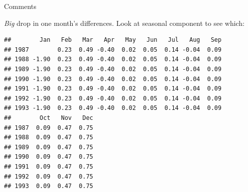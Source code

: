 \begin{frame}[fragile]{Comments}
  
\emph{Big} drop in one month's differences. Look at seasonal component to
see which:  
  


{\small
\begin{knitrout}
\color{fgcolor}\begin{kframe}
\begin{alltt}
\hlopt{$}\hlstd{)}
\end{alltt}
\begin{verbatim}
##        Jan   Feb   Mar   Apr   May   Jun   Jul   Aug   Sep
## 1987        0.23  0.49 -0.40  0.02  0.05  0.14 -0.04  0.09
## 1988 -1.90  0.23  0.49 -0.40  0.02  0.05  0.14 -0.04  0.09
## 1989 -1.90  0.23  0.49 -0.40  0.02  0.05  0.14 -0.04  0.09
## 1990 -1.90  0.23  0.49 -0.40  0.02  0.05  0.14 -0.04  0.09
## 1991 -1.90  0.23  0.49 -0.40  0.02  0.05  0.14 -0.04  0.09
## 1992 -1.90  0.23  0.49 -0.40  0.02  0.05  0.14 -0.04  0.09
## 1993 -1.90  0.23  0.49 -0.40  0.02  0.05  0.14 -0.04  0.09
##        Oct   Nov   Dec
## 1987  0.09  0.47  0.75
## 1988  0.09  0.47  0.75
## 1989  0.09  0.47  0.75
## 1990  0.09  0.47  0.75
## 1991  0.09  0.47  0.75
## 1992  0.09  0.47  0.75
## 1993  0.09  0.47  0.75
\end{verbatim}
\end{kframe}
\end{knitrout}
}
  
\end{frame}


